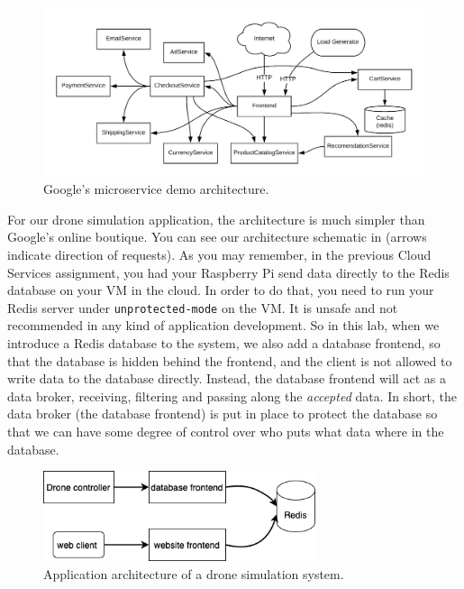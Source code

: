\documentclass{article}
\begin{document}
\begin{figure}[h!]
    \centering
    \includegraphics[width=150mm]{architecture-diagram.png}
    \caption{Google's microservice demo architecture.}
    \label{fig:hipster}
\end{figure}

For our drone simulation application, the architecture is much simpler than Google's online boutique. You can see our architecture schematic in  (arrows indicate direction of requests). As you may remember, in the previous Cloud Services assignment, you had your Raspberry Pi send data directly to the Redis database on your VM in the cloud. In order to do that, you need to run your Redis server under \verb!unprotected-mode! on the VM. It is unsafe and not recommended in any kind of application development. So in this lab, when we introduce a Redis database to the system, we also add a database frontend, so that the database is hidden behind the frontend, and the client is not allowed to write data to the database directly. Instead, the database frontend will act as a data broker, receiving, filtering and passing along the \textit{accepted} data. In short, the data broker (the database frontend) is put in place to protect the database so that we can have some degree of control over who puts what data where in the database.

\begin{figure}[h!]
    \centering
    \includegraphics[width=80mm]{drone-system-architecture.drawio.png}
    \caption{Application architecture of a drone simulation system.}
    \label{fig:drone}
\end{figure}
\end{document}

